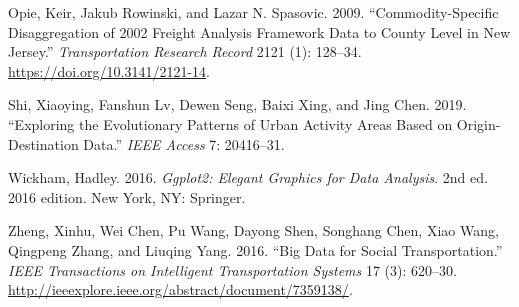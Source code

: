\documentclass[
]{article}
\newlength{\cslhangindent}
\newlength{\cslentryspacingunit} %
\newenvironment{CSLReferences}[2] %
 {%
  \setlength{\parindent}{0pt}
  \ifodd #1
  \let\oldpar\par
  \def\par{\hangindent=\cslhangindent\oldpar}
  \fi
  \setlength{\parskip}{#2\cslentryspacingunit}
 }%
 {}
\begin{document}
\begin{CSLReferences}{1}{0}
\leavevmode{}%
Opie, Keir, Jakub Rowinski, and Lazar N. Spasovic. 2009. {``Commodity-{Specific Disaggregation} of 2002 {Freight Analysis Framework Data} to {County Level} in {New Jersey}.''} \emph{Transportation Research Record} 2121 (1): 128--34. \url{https://doi.org/10.3141/2121-14}.

\leavevmode{}%
Shi, Xiaoying, Fanshun Lv, Dewen Seng, Baixi Xing, and Jing Chen. 2019. {``Exploring the Evolutionary Patterns of Urban Activity Areas Based on Origin-Destination Data.''} \emph{IEEE Access} 7: 20416--31.

\leavevmode{}%
Wickham, Hadley. 2016. \emph{Ggplot2: {Elegant Graphics} for {Data Analysis}}. 2nd ed. 2016 edition. {New York, NY}: {Springer}.

\leavevmode{}%
Zheng, Xinhu, Wei Chen, Pu Wang, Dayong Shen, Songhang Chen, Xiao Wang, Qingpeng Zhang, and Liuqing Yang. 2016. {``Big Data for Social Transportation.''} \emph{IEEE Transactions on Intelligent Transportation Systems} 17 (3): 620--30. \url{http://ieeexplore.ieee.org/abstract/document/7359138/}.

\end{CSLReferences}
\end{document}
